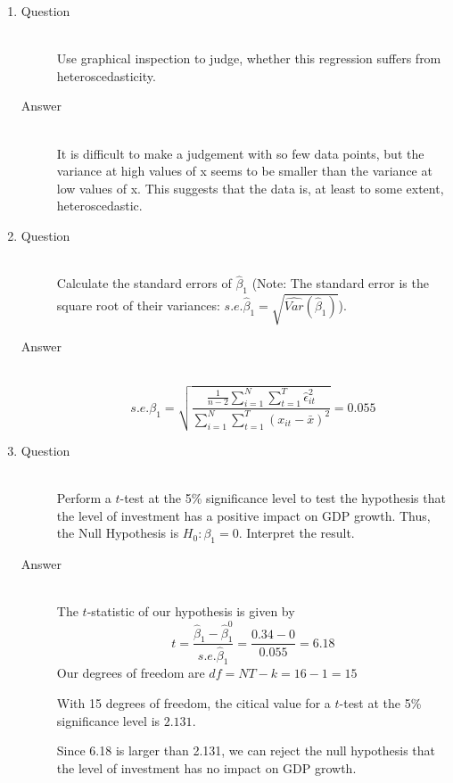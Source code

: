 \documentclass{article}
\begin{document}
\begin{enumerate}
  \item
  \begin{description}
    \item[Question] \hfill \\
    Use graphical inspection to judge, whether this regression suffers from heteroscedasticity.
    \item[Answer] \hfill \\
    It is difficult to make a judgement with so few data points, but the variance at high values of x seems to be smaller than the variance at low values of x. This suggests that the data is, at least to some extent, heteroscedastic.
  \end{description}
  
  \item
  \begin{description}
    \item[Question] \hfill \\
    Calculate the standard errors of $\hat{\beta}_{1}$ (Note: The standard error is the square root of their variances: $s.e.\hat{\beta}_{1} = \sqrt{\hat{Var}(\hat{\beta}_{1})}$).
    \item[Answer] \hfill \\
    $$ s.e.\beta_{1}= \sqrt{\frac{\frac{1}{n-2}\sum_{i=1}^{N}\sum_{t=1}^{T}{\hat{\epsilon}^2_{it}}}{\sum_{i=1}^{N}\sum_{t=1}^{T}(x_{it}-\bar{x})^2}} = 0.055$$
  \end{description}
  
  \item
  \begin{description}
    \item[Question] \hfill \\
    Perform a $t$-test at the 5\% significance level to test the hypothesis that the level of investment has a positive impact on GDP growth. Thus, the Null Hypothesis is $H_{0} : \beta_{1} = 0$. Interpret the result.
    \item[Answer] \hfill \\
    The $t$-statistic of our hypothesis is given by
    $$ t = \frac{\hat{\beta}_1-\hat{\beta}^0_1}{s.e.\hat{\beta}_1} = \frac{0.34-0}{0.055} = 6.18$$
    Our degrees of freedom are $df = NT - k = 16-1 = 15$
    
    With 15 degrees of freedom, the citical value for a $t$-test at the 5\% significance level  is $2.131$.
    
    Since 6.18 is larger than 2.131, we can reject the null hypothesis that the level of investment has no impact on GDP growth.
  \end{description}
  

\end{enumerate}
\end{document}
